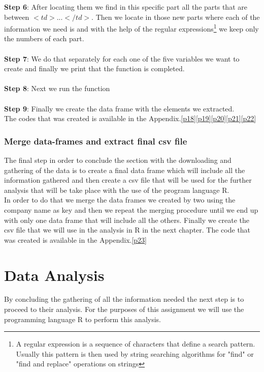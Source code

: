 \documentclass{book}
\begin{document}
\textbf{Step 6}: After locating them we find in this specific part all the parts that are between $<td>...</td>$. Then we locate in those new parts where each of the information we need is and with the help of the regular expressions\footnote{A regular expression is  a sequence of characters that define a search pattern. Usually this pattern is then used by string searching algorithms for "find" or "find and replace" operations on strings} we keep only the numbers of each part.\\\\\textbf{Step 7}: We do that separately for each one of the five variables we want to create and finally we print that the function is completed.\\\\
\textbf{Step 8}: Next we run the function\\\\
\textbf{Step 9}: Finally we create the data frame with the elements we extracted.\\
The codes that was created is available in the Appendix.\ref{p18}\ref{p19}\ref{p20}\ref{p21}\ref{p22} 

\subsection{Merge data-frames and extract final csv file}
The final step in order to conclude the section with the downloading and gathering of the data is to create a final data frame which will include all the information gathered and then create a csv file that will be used for the further analysis that will be take place with the use of the program language R.\\
In order to do that we merge the data frames we created by two using the company name as key and then we repeat the merging procedure until we end up with only one data frame that will include all the others.
Finally we create the csv file that we will use in the analysis in R in the next chapter. The code that was created is available in the Appendix.\ref{p23}
 
\chapter{Data Analysis}
By concluding the gathering of all the information needed the next step is to proceed to their analysis. For the purposes of this assignment we will use the programming language R to perform this analysis.\cite{key1}
\end{document}
